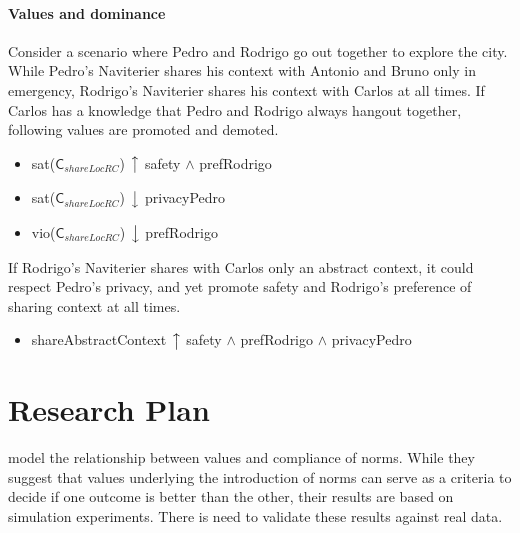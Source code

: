 \documentclass[11pt,          %
               phd,           %
               onehalfspacing %
               ]{ncsuthesis}
\newcommand{\msf}{\mathsf}
\newcommand{\C}{\msf{C}}
\newcommand{\bup}{\big\uparrow}
\newcommand{\bdown}{\big\downarrow}
\newcommand{\navigationapp}{Naviterier\xspace}
\newcommand{\nsa}[1]{\textcolor{green!50!black}{NSA:~~#1}}
\begin{document}
\paragraph*{Values and dominance}

Consider a scenario where Pedro and Rodrigo go out together to explore
the city. While Pedro's \navigationapp shares his context with Antonio
and Bruno only in emergency, Rodrigo's \navigationapp shares his context
with Carlos at all times. If Carlos has a knowledge that Pedro and Rodrigo
always hangout together, following values are promoted and demoted.

\begin{itemize}
\item sat($\C_{shareLocRC}$) $\bup$ safety $\land$ prefRodrigo

\item sat($\C_{shareLocRC}$) $\bdown$ privacyPedro

\item vio($\C_{shareLocRC}$) $\bdown$ prefRodrigo
\end{itemize}

If Rodrigo's \navigationapp shares with Carlos only an abstract
context, it could respect Pedro's privacy, and yet promote safety and
Rodrigo's preference of sharing context at all times.

\begin{itemize}
\item shareAbstractContext $\bup$ safety $\land$ prefRodrigo $\land$ privacyPedro
\end{itemize}

%

\section{Research Plan}

\citet{Dechesne-AIL13-Norms+Values}
model the relationship between values and compliance of norms. While they
suggest that values underlying the introduction of norms can serve as a
criteria to decide if one outcome is better than the other, their
results are based on simulation experiments. There is need to validate
these results against real data.
\end{document}
